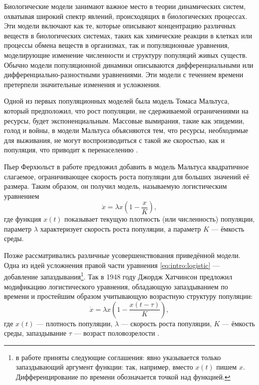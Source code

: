 
{\actuality} Биологические модели занимают важное место в теории динамических систем, охватывая широкий спектр явлений, происходящих в биологических процессах. Эти модели включают как те, которые описывают концентрацию различных веществ в биологических системах, таких как химические реакции в клетках или процессы обмена веществ в организмах, так и популяционные уравнения, моделирующие изменение численности и структуру популяций живых существ. Обычно модели популяционной динамики описываются дифференциальными или дифференциально-разностными уравнениями. 
Эти модели с течением времени претерпели значительные изменения и усложнения.

Одной из первых популяционных моделей была модель Томаса Мальтуса, который предположил, что рост популяции, не сдерживаемой ограничениями на ресурсы, будет экспоненциальным. Массовые вымирания, такие как эпидемии, голод и войны, в модели Мальтуса объясняются тем, что ресурсы, необходимые для выживания, не могут воспроизводиться с такой же скоростью, как и популяция, что приводит к перенаселению \cite{Malthus1798}.

Пьер Ферхюльст в работе \cite{Verhulst1838} предложил добавить в модель Мальтуса квадратичное слагаемое, ограничивающее скорость роста популяции для больших значений её размера. Таким образом, он получил модель, называемую логистическим уравнением
\begin{equation}
\label{eq:intro:logistic}
	\dot{x}=\lambda x\left(1-\frac{x}{K}\right),
\end{equation}
где функция $x(t)$ показывает текущую плотность (или численность) популяции, параметр $\lambda$ характеризует скорость роста популяции, а параметр $K$ --- ёмкость среды.

Позже рассматривались различные усовершенствования приведённой модели. Одна из идей усложнения правой части уравнения \eqref{eq:intro:logistic} --- добавление запаздывания\footnote{в работе приняты следующие соглашения: явно указывается только запаздывающий аргумент функции: так, например, вместо $x(t)$ пишем $x$. Дифференцирование по времени обозначается точкой над функцией.}. Так в 1948 году Джордж Хатчинсон предложил модификацию логистического уравнения, обладающую запаздыванием по времени и простейшим образом учитывающую возрастную структуру популяции:
%
\begin{equation}
\label{eq:intro:hutch}
	\dot{x}=\lambda x\left(1 - \frac{x(t-\tau)}{K}\right),
\end{equation}
%
где $x(t)$ --- плотность популяции, $\lambda$ --- скорость роста популяции, $K$ --- ёмкость среды, запаздывание $\tau$ --- возраст половозрелости \cite{Hutchinson1948}. %

